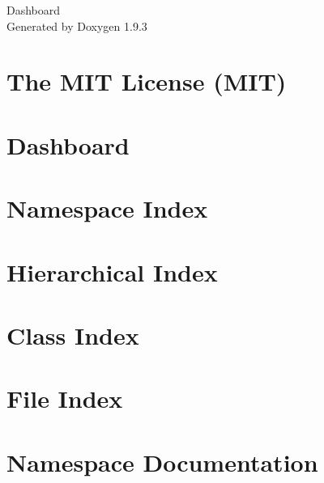 \documentclass[twoside]{book}
\newcommand{\+}{\discretionary{\mbox{\scriptsize$\hookleftarrow$}}{}{}}
\newcommand{\clearemptydoublepage}{%
    \newpage{\pagestyle{empty}\cleardoublepage}%
  }
\begin{document}
  \raggedbottom
    \hypersetup{pageanchor=false,
                bookmarksnumbered=true,
                pdfencoding=unicode
               }
  \begin{titlepage}
  \vspace*{7cm}
  \begin{center}%
  {\Large Dashboard}\\
  \vspace*{1cm}
  {\large Generated by Doxygen 1.9.3}\\
  \end{center}
  \end{titlepage}
  \clearemptydoublepage
  \tableofcontents
  \clearemptydoublepage
  \hypersetup{pageanchor=true}
\chapter{The MIT License (MIT)}
\label{md_Dashboard_wwwroot_lib_jquery_validation_LICENSE}

\chapter{Dashboard}
\label{md_README}

\chapter{Namespace Index}

\chapter{Hierarchical Index}

\chapter{Class Index}

\chapter{File Index}

\chapter{Namespace Documentation}










\end{document}
